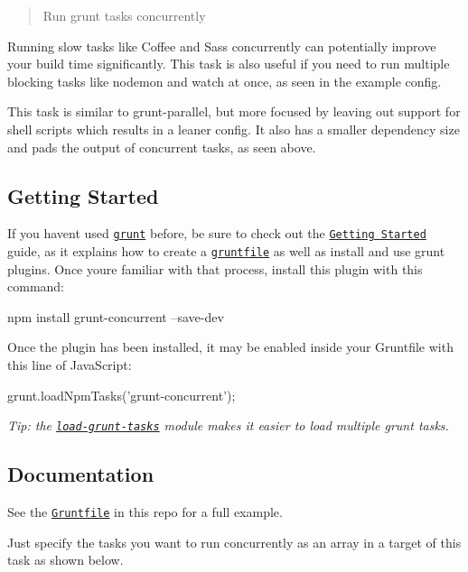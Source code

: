 \begin{quote}
Run grunt tasks concurrently \end{quote}


Running slow tasks like Coffee and Sass concurrently can potentially improve your build time significantly. This task is also useful if you need to run multiple blocking tasks like {\ttfamily nodemon} and {\ttfamily watch} at once, as seen in the example config.



This task is similar to grunt-\/parallel, but more focused by leaving out support for shell scripts which results in a leaner config. It also has a smaller dependency size and pads the output of concurrent tasks, as seen above.

\subsection*{Getting Started}

If you haven\textquotesingle{}t used \href{http://gruntjs.com}{\tt grunt} before, be sure to check out the \href{https://github.com/gruntjs/grunt/wiki/Getting-started}{\tt Getting Started} guide, as it explains how to create a \href{https://github.com/gruntjs/grunt/wiki/Getting-started}{\tt gruntfile} as well as install and use grunt plugins. Once you\textquotesingle{}re familiar with that process, install this plugin with this command\+:


\begin{DoxyCode}
npm install grunt-concurrent --save-dev
\end{DoxyCode}


Once the plugin has been installed, it may be enabled inside your Gruntfile with this line of Java\+Script\+:


\begin{DoxyCode}
grunt.loadNpmTasks('grunt-concurrent');
\end{DoxyCode}


{\itshape Tip\+: the \href{https://github.com/sindresorhus/load-grunt-tasks}{\tt load-\/grunt-\/tasks} module makes it easier to load multiple grunt tasks.}

\subsection*{Documentation}

See the \href{Gruntfile.js}{\tt Gruntfile} in this repo for a full example.

Just specify the tasks you want to run concurrently as an array in a target of this task as shown below.


